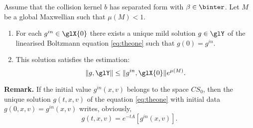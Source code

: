 \begin{theorem}\label{th:exists}
	Assume that the collision kernel $b$ has
	separated form with $\beta\in \binter$. Let $M$ be a global Maxwellian such 
	that $\mu(M)<1$.
	\begin{enumerate}
	     \item \label{eit:exists}
		For each $g^{in}\in \glX{0}$ there exists a unique mild solution $g\in \glY$
		of the linearised Boltzmann equation \eqref{eq:theone} such that $g(0)=g^{in}$.
		\item  This	solution satisfies the estimation: \[\|g,\glY\|\le    \|g^{in},\glX{0}\|e^{ \mu (M)}. \]
\end{enumerate}
\end{theorem}
\noindent
\textbf{Remark.} If the initial value $g^{in}(x,v)$ belongs to the space $CS_0$, then the unique solution $g(t,x,v)$ of the equation \eqref{eq:theone} with initial data $g(0,x,v) = g^{in}(x,v)$ writes, obviously,\[g(t,x,v)=e^{-tA}[g^{in}(x,v)].\]
